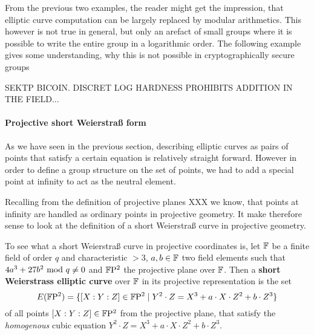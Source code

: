 From the previous two examples, the reader might get the impression, that elliptic curve computation can be largely replaced by modular arithmetics. This however is not true in general, but only an arefact of small groups where it is possible to write the entire group in a logarithmic order. The following example gives some understanding, why this is not possible in cryptographically secure groups
\begin{example}
SEKTP BICOIN. DISCRET LOG HARDNESS PROHIBITS ADDITION IN THE FIELD...
\end{example}
\paragraph{Projective short Weierstraß form}
As we have seen in the previous section, describing elliptic curves as pairs of points that satisfy a certain equation is relatively straight forward. However in order to define a group structure on the set of points, we had to add a special point at infinity to act as the neutral element.

Recalling from the definition of projective planes XXX we know, that points at infinity are handled as ordinary points in projective geometry. It make therefore sense to look at the definition of a short Weierstraß curve in projective geometry.

To see what a short Weierstraß curve in projective coordinates is, let $\mathbb{F}$ be a finite field of order $q$ and characteristic $>3$, $a,b\in \mathbb{F}$ two field elements such that $4a^3+ 27b^2 \text{ mod } q\neq 0$ and $\mathbb{F}\mathrm{P}^2$ the projective plane over $\mathbb{F}$. Then a \textbf{short Weierstrass elliptic curve} over $\mathbb{F}$ in its projective representation is the set
\begin{equation}
\label{def_short_weierstrass_curve}
E(\mathbb{F}\mathrm{P}^2) = \{[X:Y:Z]\in \mathbb{F}\mathrm{P}^2\;|\; Y^2\cdot Z = X^3+a\cdot X\cdot Z^2 + b\cdot Z^3 \}
\end{equation}
of all points $[X:Y:Z]\in \mathbb{F}\mathrm{P}^2$ from the projective plane, that satisfy the \textit{homogenous} cubic equation $Y^2\cdot Z = X^3+a\cdot X\cdot Z^2 + b\cdot Z^3$.

